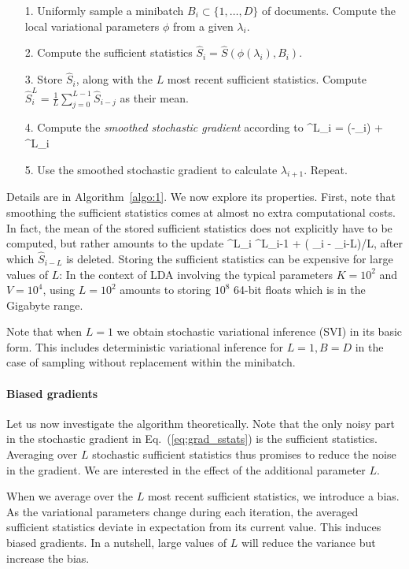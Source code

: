 \documentclass{article} %
\begin{document}
\begin{itemize}
\item[1.] Uniformly sample a minibatch ${B}_i \subset \{1,\dots,D\}$ of documents. Compute the local variational parameters $\phi$ from a given $\lambda_i$.
\item[2.] Compute the sufficient statistics $\hat{S}_i = \hat{S}(\phi(\lambda_i),B_i)$.
\item[3.] Store $\hat{S}_i$, along with the $L$ most recent sufficient statistics. Compute $\hat{S}^L_i =\frac{1}{L}\sum_{j=0}^{L-1}\hat{S}_{i-j}$ as their mean.
\item[4.] Compute the \textit{smoothed stochastic gradient} according to
\be
\label{eq:smoothedgradient}
^L_i = (\eta-\lambda_i) + ^L_i
\ee
\item[5.] Use the smoothed stochastic gradient to calculate $\lambda_{i+1}$. Repeat.
\end{itemize}

Details are in Algorithm~\ref{algo:1}. We now explore its properties.
First, note that smoothing the sufficient statistics comes at almost no extra computational costs. In fact,
the mean of the stored sufficient statistics does not explicitly have to be computed, but rather amounts to the update
\be
  ^L_{i} \leftarrow   {}^L_{i-1} +  ( _i   -    _{i-L})/L,
\ee
after which $ \hat{S} _{i-L}$ is deleted. Storing the sufficient statistics can be expensive for large values of $L$:
In the context of LDA involving the typical parameters $K = 10^2 $ and  $V = 10^4 $, using $L=10^2$ amounts to
storing $10^8$ 64-bit floats which is in the Gigabyte range.

Note that when $L=1$ we obtain stochastic variational inference (SVI) in its basic form. This includes
deterministic variational inference for $L=1, B=D$ in the case of sampling without replacement within the minibatch.


\paragraph{Biased gradients}


Let us now investigate the algorithm theoretically.
Note that the only noisy part in the stochastic gradient in Eq.~(\ref{eq:grad_sstats}) is the sufficient statistics.
Averaging over $L$ stochastic sufficient statistics thus promises to reduce the noise in the gradient.
We are interested in the effect of the additional parameter $L$.

When we average over the $L$ most recent sufficient statistics, we introduce a bias.
As the variational parameters change during each iteration, the averaged sufficient statistics deviate in expectation from its current value.
This induces biased gradients.
In a nutshell, large values of $L$ will reduce the variance but increase the bias.
\end{document}
